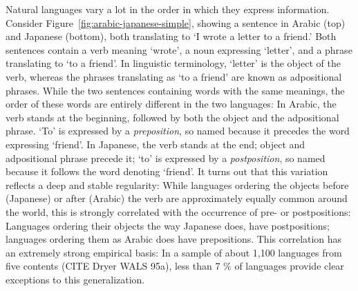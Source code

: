 \documentclass[9pt,twocolumn,twoside,lineno]{pnas-new}
\begin{document}
Natural languages vary a lot in the order in which they express information.
Consider Figure~\ref{fig:arabic-japanese-simple}, showing a sentence in Arabic (top) and Japanese (bottom), both translating to `I wrote a letter to a friend.'
Both sentences contain a verb meaning `wrote', a noun expressing  `letter', and a phrase translating to `to a friend'.
In linguistic terminology, `letter' is the object of the verb, whereas the phrases translating as `to a friend' are known as adpositional phrases.
While the two sentences containing words with the same meanings, the order of these words are entirely different in the two languages:
In Arabic, the verb stands at the beginning, followed by both the object and the adpositional phrase.
`To' is expressed by a \emph{preposition}, so named because it precedes the word expressing `friend'. %
In Japanese, the verb stands at the end; object and adpositional phrase precede it; `to' is expressed by a \textit{postposition}, so named because it follows the word denoting `friend'.
It turns out that this variation reflects a deep and stable regularity:
While languages ordering the objects before (Japanese) or after (Arabic) the verb are approximately equally common around the world,
this is strongly correlated with the occurrence of pre- or postpositions:
Languages ordering their objects the way Japanese does, have postpositions; languages ordering them as Arabic does have prepositions.
This correlation has an extremely strong empirical basis:
In a sample of about 1,100 languages from five contents (CITE Dryer WALS 95a), less than 7 \% of languages provide clear exceptions to this generalization. %
\end{document}
